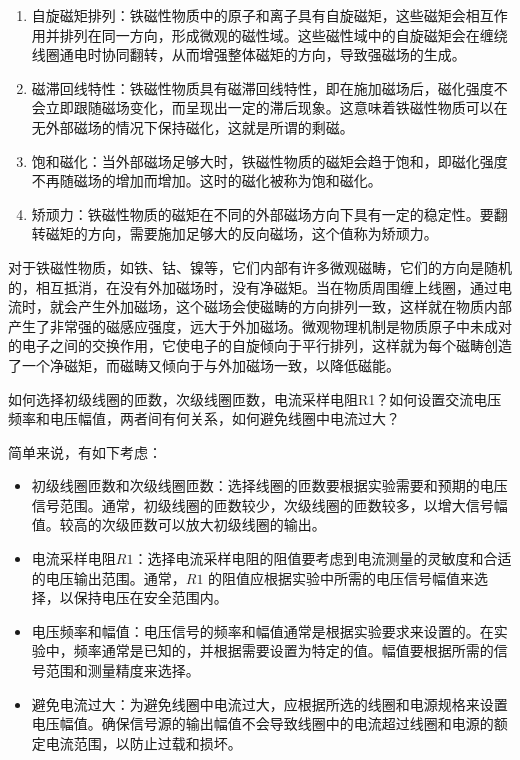 \documentclass[dvipsnames, svgnames,a4paper,11pt]{article}
\begin{document}
	\begin{enumerate}
		\item 自旋磁矩排列：铁磁性物质中的原子和离子具有自旋磁矩，这些磁矩会相互作用并排列在同一方向，形成微观的磁性域。这些磁性域中的自旋磁矩会在缠绕线圈通电时协同翻转，从而增强整体磁矩的方向，导致强磁场的生成。
		
		\item 磁滞回线特性：铁磁性物质具有磁滞回线特性，即在施加磁场后，磁化强度不会立即跟随磁场变化，而呈现出一定的滞后现象。这意味着铁磁性物质可以在无外部磁场的情况下保持磁化，这就是所谓的剩磁。
		
		\item 饱和磁化：当外部磁场足够大时，铁磁性物质的磁矩会趋于饱和，即磁化强度不再随磁场的增加而增加。这时的磁化被称为饱和磁化。
		
		\item 矫顽力：铁磁性物质的磁矩在不同的外部磁场方向下具有一定的稳定性。要翻转磁矩的方向，需要施加足够大的反向磁场，这个值称为矫顽力。
	\end{enumerate}
	
	对于铁磁性物质，如铁、钴、镍等，它们内部有许多微观磁畴，它们的方向是随机的，相互抵消，在没有外加磁场时，没有净磁矩。当在物质周围缠上线圈，通过电流时，就会产生外加磁场，这个磁场会使磁畴的方向排列一致，这样就在物质内部产生了非常强的磁感应强度，远大于外加磁场。微观物理机制是物质原子中未成对的电子之间的交换作用，它使电子的自旋倾向于平行排列，这样就为每个磁畴创造了一个净磁矩，而磁畴又倾向于与外加磁场一致，以降低磁能。
		
	\begin{question}
		如何选择初级线圈的匝数，次级线圈匝数，电流采样电阻R1？如何设置交流电压频率和电压幅值，两者间有何关系，如何避免线圈中电流过大？
	\end{question}
	简单来说，有如下考虑：
	\begin{itemize}
		\item 初级线圈匝数和次级线圈匝数：选择线圈的匝数要根据实验需要和预期的电压信号范围。通常，初级线圈的匝数较少，次级线圈的匝数较多，以增大信号幅值。较高的次级匝数可以放大初级线圈的输出。
		
		\item 电流采样电阻\(R1\)：选择电流采样电阻的阻值要考虑到电流测量的灵敏度和合适的电压输出范围。通常，\(R1\) 的阻值应根据实验中所需的电压信号幅值来选择，以保持电压在安全范围内。
		
		\item 电压频率和幅值：电压信号的频率和幅值通常是根据实验要求来设置的。在实验中，频率通常是已知的，并根据需要设置为特定的值。幅值要根据所需的信号范围和测量精度来选择。
		
		\item 避免电流过大：为避免线圈中电流过大，应根据所选的线圈和电源规格来设置电压幅值。确保信号源的输出幅值不会导致线圈中的电流超过线圈和电源的额定电流范围，以防止过载和损坏。
	\end{itemize}
	
\end{document}
